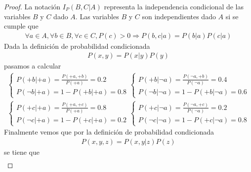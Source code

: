 \documentclass[12pt,a4paper]{article}
\begin{document}
\begin{enumerate}
\begin{enumerate}
        \begin{proof}
            La notación $I_P(B, C | A)$ representa la independencia condicional de las variables $B$ y $C$ dado $A$. Las variables $B$ y $C$ son independientes dado $A$ si se cumple que
            \begin{align*}
                \forall a \in A, \forall b \in B, \forall c \in C, P(c) > 0 \Rightarrow P(b, c | a) = P(b | a) P(c | a) 
            \end{align*}
            Dada la definición de probabilidad condicionada 
            \begin{align*}
                P(x, y) = P(x | y) P(y)
            \end{align*}
            pasamos a calcular
            \begin{align*}
                \begin{cases}
                    P(+b | +a) = \frac{P(+a, +b)}{P(+a)} = 0.2 \\
                    P(\neg b | +a) = 1 - P(+b | +a) = 0.8 
                \end{cases}
                \begin{cases}
                    P(+b | \neg a) = \frac{P(\neg a, + b)}{P(\neg a)} = 0.4 \\
                    P(\neg b | \neg a) = 1 - P(+b | \neg a) = 0.6
                \end{cases}
            \end{align*}
            \begin{align*}
                \begin{cases}
                    P(+c | +a) = \frac{P(+a, +c)}{P(+a)} = 0.8 \\
                    P(\neg c | +a) = 1 - P(+c | +a) = 0.2 
                \end{cases}
                \begin{cases}
                    P(+c | \neg a) = \frac{P(\neg a, + c)}{P(\neg a)} = 0.2 \\
                    P(\neg c | \neg a) = 1 - P(+c | \neg a) = 0.8
                \end{cases}
            \end{align*}
            Finalmente vemos que por la definición de probabilidad condicionada 
            \begin{align*}
                P(x, y, z) = P(x, y | z) P(z)
            \end{align*}
            se tiene que
            \begin{align*}

\end{align*}
\end{proof}
\end{enumerate}
\end{enumerate}
\end{document}
